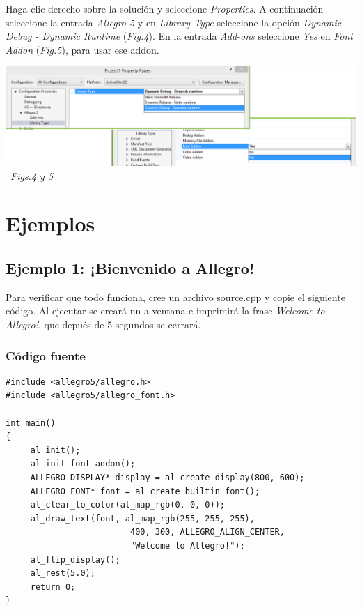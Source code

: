 \documentclass[11pt]{article}
\begin{document}
Haga clic derecho sobre la solución y seleccione \emph{Properties}. A continuación seleccione la entrada \emph{Allegro 5} y en \emph{Library Type} seleccione la opción \emph{Dynamic Debug - Dynamic Runtime} (\emph{Fig.4}).
En la entrada \emph{Add-ons} seleccione \emph{Yes} en \emph{Font Addon} (\emph{Fig.5}), para usar ese addon.\\
\begin{center}
\includegraphics[scale=0.4]{SC67.png}
\ \emph{Figs.4 y 5}
\end{center}

\section{Ejemplos}
\subsection{Ejemplo 1: ¡Bienvenido a Allegro!}
Para verificar que todo funciona, cree un archivo source.cpp y copie el siguiente código.
Al ejecutar se creará un a ventana e imprimirá la frase \emph{Welcome to Allegro!}, que depués de 5 segundos se cerrará.
\subsubsection{Código fuente}
\begin{verbatim}
#include <allegro5/allegro.h>
#include <allegro5/allegro_font.h>
 
int main()
{
     al_init();
     al_init_font_addon();
     ALLEGRO_DISPLAY* display = al_create_display(800, 600);
     ALLEGRO_FONT* font = al_create_builtin_font();
     al_clear_to_color(al_map_rgb(0, 0, 0));
     al_draw_text(font, al_map_rgb(255, 255, 255),
                         400, 300, ALLEGRO_ALIGN_CENTER, 
                         "Welcome to Allegro!");
     al_flip_display();
     al_rest(5.0);
     return 0;
}
\end{verbatim}
\end{document}
